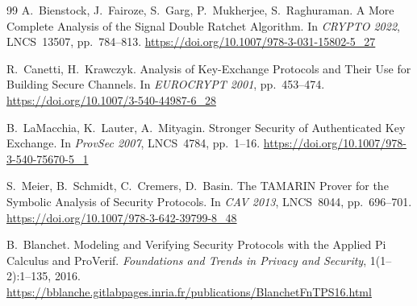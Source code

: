 \documentclass[11pt,a4paper]{article}
\theoremstyle{definition}
\begin{document}
\begin{thebibliography}{99}
A.~Bienstock, J.~Fairoze, S.~Garg, P.~Mukherjee, S.~Raghuraman.
\newblock A More Complete Analysis of the Signal Double Ratchet Algorithm.
\newblock In \emph{CRYPTO 2022}, LNCS~13507, pp.~784--813.
\newblock \url{https://doi.org/10.1007/978-3-031-15802-5_27}

R.~Canetti, H.~Krawczyk.
\newblock Analysis of Key-Exchange Protocols and Their Use for Building
  Secure Channels.
\newblock In \emph{EUROCRYPT 2001}, pp.~453--474.
\newblock \url{https://doi.org/10.1007/3-540-44987-6_28}

B.~LaMacchia, K.~Lauter, A.~Mityagin.
\newblock Stronger Security of Authenticated Key Exchange.
\newblock In \emph{ProvSec 2007}, LNCS~4784, pp.~1--16.
\newblock \url{https://doi.org/10.1007/978-3-540-75670-5_1}

S.~Meier, B.~Schmidt, C.~Cremers, D.~Basin.
\newblock The TAMARIN Prover for the Symbolic Analysis of Security
  Protocols.
\newblock In \emph{CAV 2013}, LNCS~8044, pp.~696--701.
\newblock \url{https://doi.org/10.1007/978-3-642-39799-8_48}

B.~Blanchet.
\newblock Modeling and Verifying Security Protocols with the Applied
  Pi Calculus and ProVerif.
\newblock \emph{Foundations and Trends in Privacy and Security},
  1(1--2):1--135, 2016.
\newblock \url{https://bblanche.gitlabpages.inria.fr/publications/BlanchetFnTPS16.html}

\end{thebibliography}
\end{document}
